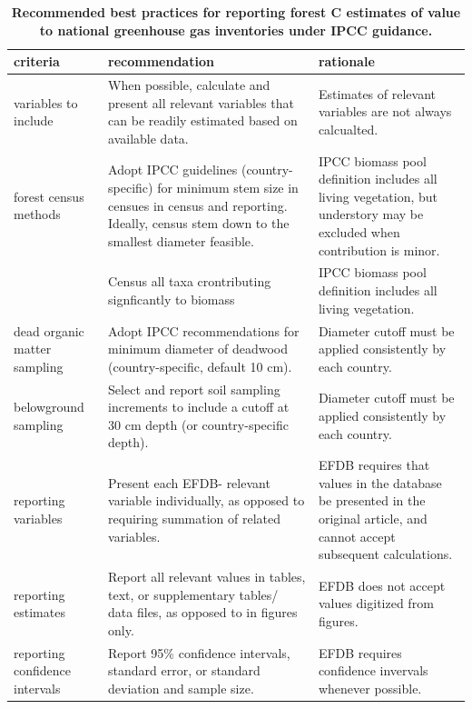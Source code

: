 \documentclass[, manuscript]{copernicus}
\begin{document}
\begin{table}

\caption{\label{tab:table_recommendations}\textbf{Recommended best practices for reporting forest C estimates of value to national greenhouse gas inventories under IPCC guidance.}}
\centering
\fontsize{10}{12}\selectfont
\begin{tabu} to 
\hline
\textbf{criteria} & \textbf{recommendation} & \textbf{rationale}\\
\hline
variables to include & When possible, calculate and present all relevant variables that can be readily estimated based on available data. & Estimates of relevant variables are not always calcualted.\\
\hline
forest census methods & Adopt IPCC guidelines (country-specific) for minimum stem size in censues in census and reporting. Ideally, census stem down to the smallest diameter feasible. & IPCC biomass pool definition includes all living vegetation, but understory may be excluded when contribution is minor.\\
\hline
 & Census all taxa crontributing signficantly to biomass & IPCC biomass pool definition includes all living vegetation.\\
\hline
dead organic matter sampling & Adopt IPCC recommendations for minimum diameter of deadwood (country-specific, default 10 cm). & Diameter cutoff must be applied consistently by each country.\\
\hline
belowground sampling & Select and report soil sampling increments to include a cutoff at 30 cm depth (or country-specific depth). & Diameter cutoff must be applied consistently by each country.\\
\hline
reporting variables & Present each EFDB- relevant variable individually, as opposed to requiring summation of related variables. & EFDB requires that values in the database be presented in the original article, and cannot accept subsequent calculations.\\
\hline
reporting estimates & Report all relevant values in tables, text, or supplementary tables/ data files, as opposed to in figures only. & EFDB does not accept values digitized from figures.\\
\hline
reporting confidence intervals & Report 95\% confidence intervals, standard error, or standard deviation and sample size. & EFDB requires confidence invervals whenever possible.\\
\hline
\end{tabu}
\end{table}
\end{document}
